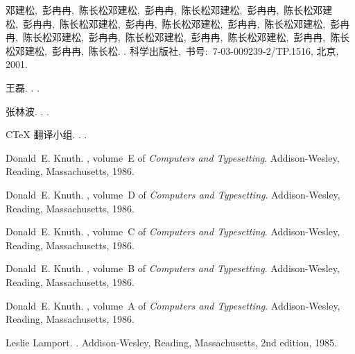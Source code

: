 ﻿%
\begin{thebibliography}{10}

{邓建松,~彭冉冉,~陈长松邓建松,~彭冉冉,~陈长松邓建松,~彭冉冉,~陈长松邓建松,~彭冉冉,~陈长松邓建松,~彭冉冉,~陈长松邓建松,~彭冉冉,~陈长松邓建松,~彭冉冉,~陈长松邓建松,~彭冉冉,~陈长松邓建松,~彭冉冉,~陈长松邓建松,~彭冉冉,~陈长松邓建松,~彭冉冉,~陈长松}.
.
\newblock 科学出版社,~书号:~7-03-009239-2/TP.1516, 北京, 2001.

王磊.
.
.

张林波.
.
.

C\TeX{} 翻译小组.
.
.

Donald~E. Knuth.
, volume~E of {\em Computers and
  Typesetting}.
\newblock Addison-Wesley, Reading, Massachusetts, 1986.

Donald~E. Knuth.
, volume~D of {\em Computers and
  Typesetting}.
\newblock Addison-Wesley, Reading, Massachusetts, 1986.

Donald~E. Knuth.
, volume~C of {\em Computers and
  Typesetting}.
\newblock Addison-Wesley, Reading, Massachusetts, 1986.

Donald~E. Knuth.
, volume~B of {\em Computers and
  Typesetting}.
\newblock Addison-Wesley, Reading, Massachusetts, 1986.

Donald~E. Knuth.
, volume~A of {\em Computers and Typesetting}.
\newblock Addison-Wesley, Reading, Massachusetts, 1986.

Leslie Lamport.
.
\newblock Addison-Wesley, Reading, Massachusetts, 2nd edition, 1985.

\end{thebibliography}
